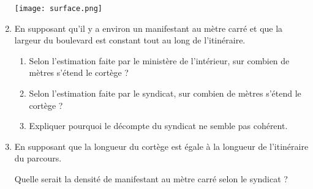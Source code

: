 \documentclass[a4paper]{article}
\begin{document}
\begin{enumerate}
	  {\color{blue} 
	    \begin{center}
	      \texttt{[image: surface.png]}
	    \end{center}
	  }


	\item En supposant qu'il y a environ un manifestant au mètre carré et que la largeur du boulevard est constant tout au long de l'itinéraire.
	  \begin{enumerate}
	    \item Selon l'estimation faite par le ministère de l'intérieur, sur combien de mètres s'étend le cortège ? 


	      
	    \item Selon l'estimation faite par le syndicat, sur combien de mètres s'étend le cortège ? 


	      

	    \item Expliquer pourquoi le décompte du syndicat ne semble pas cohérent. 

	      
	  \end{enumerate}

	\item En supposant que la longueur du cortège est égale à la longueur de l'itinéraire du parcours. 

	  Quelle serait la densité de manifestant au mètre carré selon le syndicat ? 


      \end{enumerate} 
\end{document}
